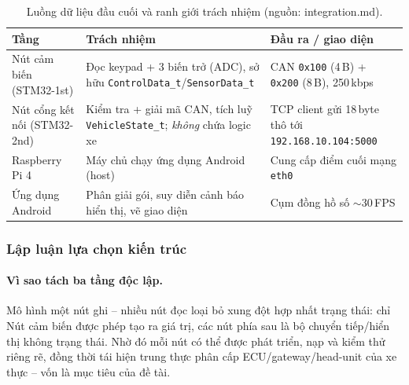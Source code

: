 \documentclass[../DoAn.tex]{subfiles}
\begin{document}
\begin{table}[H]
  \centering
  \caption{Luồng dữ liệu đầu cuối và ranh giới trách nhiệm (nguồn: integration.md).}
  \label{tab:dataflow}
  \begin{tabular}{@{}p{2.6cm}p{4.2cm}p{4.6cm}@{}}
    \toprule
    \textbf{Tầng} & \textbf{Trách nhiệm} & \textbf{Đầu ra / giao diện} \\
    \midrule
    Nút cảm biến (STM32-1st) & Đọc keypad + 3 biến trở (ADC), sở hữu
      \texttt{ControlData\_t}/\texttt{SensorData\_t} & CAN \texttt{0x100} (4\,B) +
      \texttt{0x200} (8\,B), 250\,kbps \\
    Nút cổng kết nối (STM32-2nd) & Kiểm tra + giải mã CAN, tích luỹ
      \texttt{VehicleState\_t}; \emph{không} chứa logic xe & TCP client gửi
      18\,byte thô tới \texttt{192.168.10.104:5000} \\
    Raspberry Pi 4 & Máy chủ chạy ứng dụng Android (host) & Cung cấp điểm cuối
      mạng \texttt{eth0} \\
    Ứng dụng Android & Phân giải gói, suy diễn cảnh báo hiển thị, vẽ giao diện &
      Cụm đồng hồ số $\sim$30\,FPS \\
    \bottomrule
  \end{tabular}
\end{table}

\subsubsection*{Lập luận lựa chọn kiến trúc}

\paragraph{Vì sao tách ba tầng độc lập.}
Mô hình một nút ghi -- nhiều nút đọc loại bỏ xung đột hợp nhất trạng thái: chỉ
Nút cảm biến được phép tạo ra giá trị, các nút phía sau là bộ chuyển tiếp/hiển
thị không trạng thái. Nhờ đó mỗi nút có thể được phát triển, nạp và kiểm thử
riêng rẽ, đồng thời tái hiện trung thực phân cấp ECU/gateway/head-unit của xe
thực -- vốn là mục tiêu của đề tài.
\end{document}
